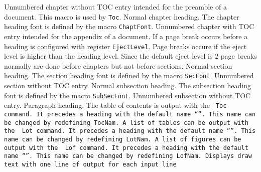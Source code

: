 \endinsert
{}%
%
\BeginDesc
{}
%
Unnumbered chapter without TOC entry intended for the preamble of a document.
This macro is used by {\tt\RS Toc}.
%
Normal chapter heading.
The chapter heading font is defined by the macro
{\tt\RS ChaptFont}.
%
Unnumbered chapter with TOC entry intended for the appendix of a document.
\End
If a page break occurs before a heading is configured with register
{\tt\RS EjectLevel}.
Page breaks occure if the eject level is higher than the heading level.
Since the default eject level is 2 page breaks normally are done before
chapters but not before sections.
%
\BeginDesc
{}
%
Normal section heading.
The section heading font is defined by the macro
{\tt\RS SecFont}.
%
Unnumbered section without TOC entry.
\End
{}%
\BeginDesc
{}
%
Normal subsection heading.
The subsection heading font is defined by the macro
{\tt\RS SubSecFont}.
%
Unnumbered subsection without TOC entry.
\End
{}%
\BeginDesc
{}
%
Paragraph heading.
\End
{}%
The table of contents is output with the
\BeginDisp\tt
\RS Toc
\End
command.
It precedes a heading with the default name ``\TocNam''.
This name can be changed by redefining {\tt\RS TocNam}.
%
A list of tables can be output with the
\BeginDisp\tt
\RS Lot
\End
command.
It precedes a heading with the default name ``\LotNam''.
This name can be changed by redefining {\tt\RS LotNam}.
%
A list of figures can be output with the
\BeginDisp\tt
\RS Lof
\End
command.
It precedes a heading with the default name ``\LofNam''.
This name can be changed by redefining {\tt\RS LofNam}.
%
Displays draw text with one line of output for each input line
